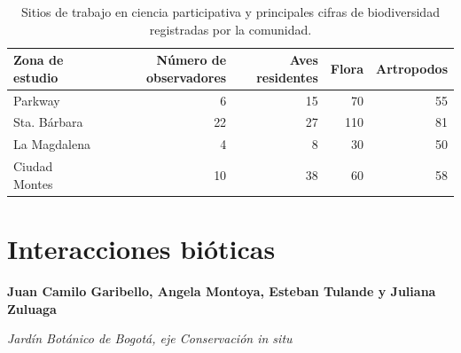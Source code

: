 \documentclass{article}
\begin{document}
\begin{table}[h]
\centering
\begin{tabular}{lrrrr}
\toprule
Zona de estudio & Número de observadores & Aves residentes & Flora & Artropodos \\
\midrule
Parkway & 6 & 15 & 70 & 55 \\
Sta. Bárbara & 22 & 27 & 110 & 81 \\
La Magdalena & 4 & 8 & 30 & 50 \\
Ciudad Montes & 10 & 38 & 60 & 58 \\
\bottomrule
\end{tabular}
\caption[Sitios de trabajo]{Sitios de trabajo en ciencia participativa y principales cifras de biodiversidad registradas por la comunidad.}
\label{bcp_tab}
\end{table}


\clearpage

\newpage

\section*{Interacciones bióticas}

\noindent \textbf{\large Juan Camilo Garibello, Angela Montoya, Esteban Tulande y Juliana Zuluaga}

\noindent \emph{Jardín Botánico de Bogotá, eje Conservación \emph{in situ}}

\bigskip
\end{document}

